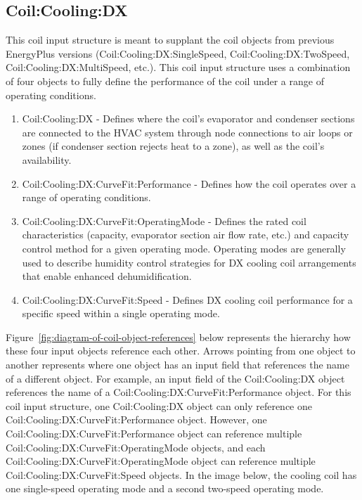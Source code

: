 \subsection{Coil:Cooling:DX}\label{coilcoolingdx}

This coil input structure is meant to supplant the coil objects from previous EnergyPlus versions (Coil:Cooling:DX:SingleSpeed, Coil:Cooling:DX:TwoSpeed, Coil:Cooling:DX:MultiSpeed, etc.). This coil input structure uses a combination of four objects to fully define the performance of the coil under a range of operating conditions.

\begin{enumerate}
\def\labelenumi{\arabic{enumi}.}
\item
 Coil:Cooling:DX - Defines where the coil's evaporator and condenser sections are connected to the HVAC system through node connections to air loops or zones (if condenser section rejects heat to a zone), as well as the coil's availability.
\item
 Coil:Cooling:DX:CurveFit:Performance - Defines how the coil operates over a range of operating conditions.
\item
 Coil:Cooling:DX:CurveFit:OperatingMode - Defines the rated coil characteristics (capacity, evaporator section air flow rate, etc.) and capacity control method for a given operating mode. Operating modes are generally used to describe humidity control strategies for DX cooling coil arrangements that enable enhanced dehumidification.
\item
 Coil:Cooling:DX:CurveFit:Speed - Defines DX cooling coil performance for a specific speed within a single operating mode.

\end{enumerate}

Figure~\ref{fig:diagram-of-coil-object-references} below represents the hierarchy how these four input objects reference each other. Arrows pointing from one object to another represents where one object has an input field that references the name of a different object. For example, an input field of the Coil:Cooling:DX object references the name of a Coil:Cooling:DX:CurveFit:Performance object. For this coil input structure, one Coil:Cooling:DX object can only reference one Coil:Cooling:DX:CurveFit:Performance object. However, one Coil:Cooling:DX:CurveFit:Performance object can reference multiple Coil:Cooling:DX:CurveFit:OperatingMode objects, and each Coil:Cooling:DX:CurveFit:OperatingMode object can reference multiple Coil:Cooling:DX:CurveFit:Speed objects. In the image below, the cooling coil has one single-speed operating mode and a second two-speed operating mode.


